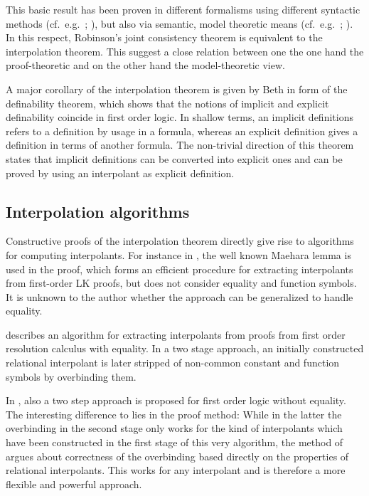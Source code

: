 \documentclass[,%
			paper=a4,%
			DIV10,
			liststotoc,
			bibtotoc,
			draft=false,%
			numbers=noendperiod
			]{scrartcl}
\begin{document}
This basic result has been proven in different formalisms using different syntactic methods (cf.~e.g.~\cite{craig57linear}; \cite{takeuti1987proof}), but also via semantic, model theoretic means (cf.~e.g.~\cite[section 5.2]{shoenfield1967mathematical}; \cite[theorem~2.2.20]{chang1990model}).
In this respect, Robinson's joint consistency theorem is equivalent to the interpolation theorem.
%
%
This suggest a close relation between one the one hand the proof-theoretic and on the other hand the model-theoretic view.

A major corollary of the interpolation theorem is given by Beth in form of the definability theorem, which shows that the notions of implicit and explicit definability coincide in first order logic.
In shallow terms, an implicit definitions refers to a definition by usage in a formula, whereas an explicit definition gives a definition in terms of another formula.
The non-trivial direction of this theorem states that implicit definitions can be converted into explicit ones and can be proved by using an interpolant as explicit definition.


\subsection{Interpolation algorithms}
\label{algos}

Constructive proofs of the interpolation theorem directly give rise to algorithms for computing interpolants.
For instance in \cite[theorem 6.6]{takeuti1987proof}, the well known Maehara lemma is used in the proof, which forms an efficient procedure for extracting interpolants from first-order LK proofs, but does not consider equality and function symbols.
It is unknown to the author whether the approach can be generalized to handle equality.

\cite{Huang95} describes an algorithm for extracting interpolants from proofs from first order resolution calculus with equality.
In a two stage approach, an initially constructed relational interpolant is later stripped of non-common constant and function symbols by overbinding them.

In \cite{baaz2011methods}, also a two step approach is proposed for first order logic without equality.
The interesting difference to \cite{Huang95} lies in the proof method:
While in the latter the overbinding in the second stage only works for the kind of interpolants which have been constructed in the first stage of this very algorithm, the method of \cite{baaz2011methods} argues about correctness of the overbinding based directly on the properties of relational interpolants.
This works for any interpolant and is therefore a more flexible and powerful approach.
\end{document}
